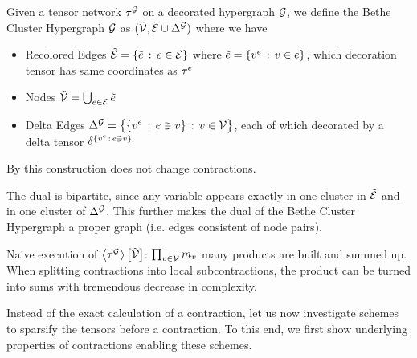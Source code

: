\begin{definition}
	Given a tensor network $\tau^{\mathcal{G}}$ on a decorated hypergraph $\mathcal{G}$, we define the Bethe Cluster Hypergraph $\tilde{\mathcal{G}}$ as
	$(\tilde{\mathcal{V}}, \tilde{\mathcal{E}} \cup \Delta^{\mathcal{G}})$ where we have
	\begin{itemize}
		\item Recolored Edges $\tilde{\mathcal{E}} = \{\tilde{e} \, : \, e\in \mathcal{E}\}$ where $\tilde{e} = \{v^{e} \, : \, v\in e\}$, which decoration tensor has same coordinates as $\tau^{e}$
		\item Nodes $\tilde{\mathcal{V}} = \bigcup_{e\in\mathcal{E}}\tilde{e}$ %
		\item Delta Edges $\Delta^{\mathcal{G}} =  \big\{ \{v^{e} \, : \, e\ni v \} \, : \, v\in\mathcal{V} \big\} $, each of which decorated by a delta tensor $\delta^{\{v^{e} \, : \, e\ni v \}}$
	\end{itemize}
\end{definition}

By  this construction does not change contractions.

The dual is bipartite, since any variable appears exactly in one cluster in $\tilde{\mathcal{E}}$ and in one cluster of $\Delta^{\mathcal{G}}$.
This further makes the dual of the Bethe Cluster Hypergraph a proper graph (i.e. edges consistent of node pairs). 







Naive execution of $\left\langle \tau^{\mathcal{G}}\right\rangle \left[ \tilde{\mathcal{V}} \right]$: $\prod_{v\in\mathcal{V}} m_{v}$ many products are built and summed up.
When splitting contractions into local subcontractions, the product can be turned into sums with tremendous decrease in complexity.





\label{sec:supportContractionEquations}

Instead of the exact calculation of a contraction, let us now investigate schemes to sparsify the tensors before a contraction.
To this end, we first show underlying properties of contractions enabling these schemes.



